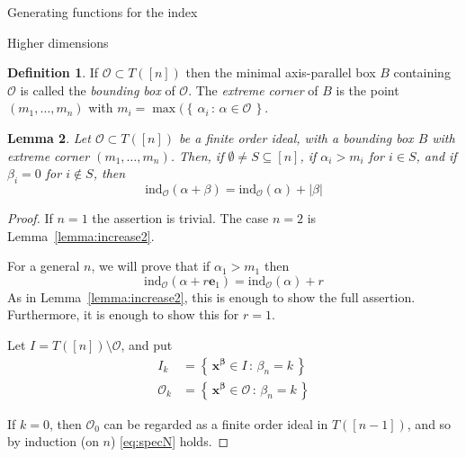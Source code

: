 \documentclass[reqno,a4paper,10pt]{amsart}
\theoremstyle{definition}
\newtheorem{definition}{Definition}
\theoremstyle{remark}
\theoremstyle{plain}
\newtheorem{lemma}[definition]{Lemma}
\newcommand{\vek}[1]{\boldsymbol{#1}}
\newcommand\setsuchas[2]{\left\{\,{#1}\,:\,{#2}\,\right\}}
\newcommand{\tdeg}[1]{\lvert #1 \rvert}
\newcommand{\ind}{\mathrm{ind}}
\begin{document}
\begin{section}{Generating functions for the index}
\begin{subsection}{Higher dimensions}
  \begin{definition}
    If \(\mathcal{O} \subset T([n])\) then the minimal axis-parallel
    box \(B\) containing \(\mathcal{O}\) is called the \emph{bounding box}
    of \(\mathcal{O}\). The \emph{extreme corner} of \(B\) is the
    point \((m_1,\dots,m_n)\) with \(m_i =
    \max(\setsuchas{\alpha_i}{\alpha \in \mathcal{O}}\).
  \end{definition}
  
  \begin{lemma}\label{lemma:increaseGeneral}
    Let \(\mathcal{O} \subset T([n])\) be a finite order ideal, with a
    bounding box \(B\) with extreme corner \((m_1,\dots,m_n)\). Then,
    if \(\emptyset \neq S \subseteq [n]\), if \(\alpha_i > m_i\) for \(i
    \in S\), and if \(\beta_i =0\) for \(i \not \in S\), then
    \begin{equation}
      \label{eq:10}
      \ind_{\mathcal{O}}(\alpha+\beta) = \ind_{\mathcal{O}}(\alpha) + \tdeg{\beta}
    \end{equation}
  \end{lemma}
  \begin{proof}
    If \(n=1\) the assertion is trivial. The case \(n=2\) is
    Lemma~\ref{lemma:increase2}. 
    
    For a general \(n\), 
    we will prove that if \(\alpha_1 > m_1\)
    then
    \begin{equation}
      \label{eq:specN}
      \ind_{\mathcal{O}}(\alpha + r\vek{e}_1) =
      \ind_{\mathcal{O}}(\alpha) +r
    \end{equation}
    As in Lemma~\ref{lemma:increase2}, this is enough to show the full
    assertion. Furthermore, it is enough to show this for \(r=1\).


    Let \(I=T([n]) \setminus \mathcal{O}\), and
    put
    \begin{displaymath}
      \begin{split}
        I_k & =\setsuchas{\vek{x}^{\vek{\beta}} \in I}{\beta_n=k} \\
        \mathcal{O}_k &= \setsuchas{\vek{x}^{\vek{\beta}} \in
          \mathcal{O}}{\beta_n=k} 
      \end{split}
    \end{displaymath}
    

    If \(k=0\), then \(\mathcal{O}_0\) can be regarded as a finite
    order ideal in \(T([n-1])\), and so by induction (on \(n\)) \eqref{eq:specN}
    holds.
    

\end{proof}
\end{subsection}
\end{section}
\end{document}
